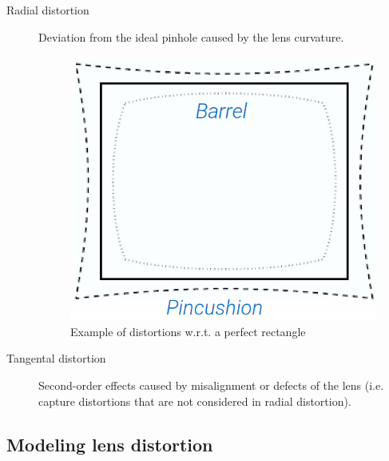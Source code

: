 \begin{description}
    \item[Radial distortion] 
        Deviation from the ideal pinhole caused by the lens curvature.


        \begin{figure}[H]
            \centering
            \includegraphics[width=0.25\linewidth]{./img/radial_distortion.png}
            \caption{Example of distortions w.r.t. a perfect rectangle}
        \end{figure}

    \item[Tangental distortion]
        Second-order effects caused by misalignment or defects of the lens (i.e. capture distortions that are not considered in radial distortion).
\end{description}


\subsection{Modeling lens distortion}

